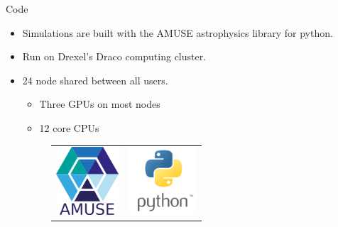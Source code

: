 \documentclass{beamer}
\begin{document}
\begin{frame}{Code}
    \begin{itemize}
        \item Simulations are built with the AMUSE astrophysics library for python.
        \item Run on Drexel's Draco computing cluster.
        \item 24 node shared between all users.
        \begin{itemize}
            \item Three GPUs on most nodes
            \item 12 core CPUs
        \end{itemize}
        \begin{figure}
            \centering
            \begin{tabular}{cc}
                \includegraphics[height=1in]{AmuseLogo} & \includegraphics[height=1in]{PythonLogo}
            \end{tabular}
        \end{figure}
    \end{itemize}
\end{frame}
\end{document}
